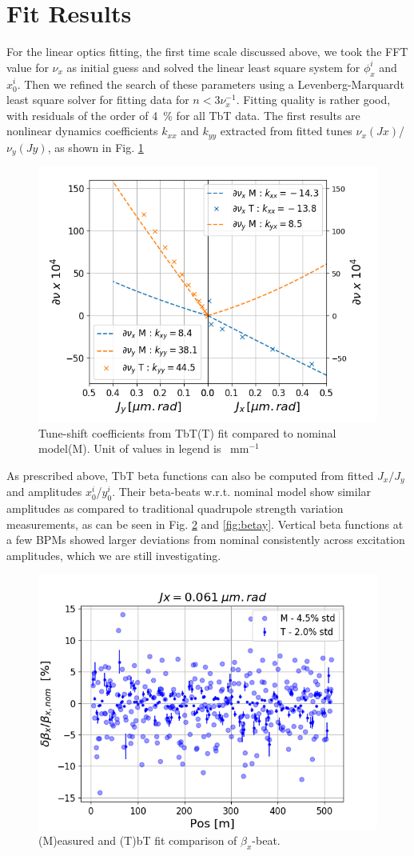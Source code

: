 \documentclass[a4paper,
               keeplastbox,   %
               ]{jacow}
\begin{document}
\section{Fit Results}

For the linear optics fitting, the first time scale discussed above, we took the FFT value for $\nu_x$ as initial guess and solved the linear least square system for $\phi^i_{x}$ and $x_0^i$. Then we refined the search of these parameters using a Levenberg-Marquardt least square solver for fitting data for $n < 3\nu^{-1}_x$. Fitting quality is rather good, with residuals of the order of \SI{4}{\percent} for all TbT data. The first results are nonlinear dynamics coefficients $k_{xx}$ and $k_{yy}$ extracted from fitted tunes $\nu_{x}(Jx)$/$\nu_{y}(Jy)$, as shown in Fig. \ref{fig:tune}
\begin{figure}[!htb]
  \centering
  \includegraphics*[width=.7\columnwidth]{TUPAB219_fig1.png}
  \caption{Tune-shift coefficients from TbT(T) fit compared to nominal model(M). Unit of values in legend is \SI{}{\milli\meter}$^{-1}$}
  \label{fig:tune}
\end{figure}
As prescribed above, TbT beta functions can also be computed from fitted $J_x/J_y$ and amplitudes $x^i_0$/$y^i_0$. Their beta-beats w.r.t. nominal model show similar amplitudes as compared to traditional quadrupole strength variation measurements, as can be seen in Fig. \ref{fig:betax} and \ref{fig:betay}. Vertical beta functions at a few BPMs showed larger deviations from nominal consistently across excitation amplitudes, which we are still investigating.
\begin{figure}[!htb]
  \centering
  \includegraphics*[width=.7\columnwidth]{TUPAB219_fig2.png}
  \caption{(M)easured and (T)bT fit comparison of $\beta_x$-beat.}
  \label{fig:betax}
\end{figure}
\end{document}
